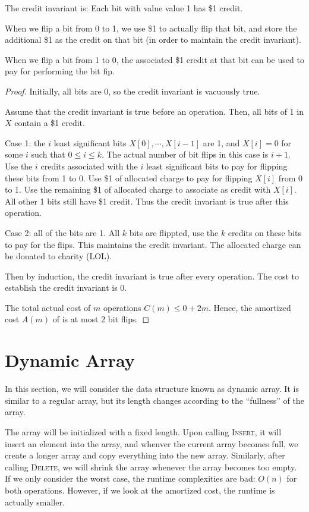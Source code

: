The credit invariant is: Each bit with value value 1 has \$1 credit.

When we flip a bit from 0 to 1, we use \$1 to actually flip that bit, and store the additional \$1 as the credit on that bit (in order to maintain the credit invariant).

When we flip a bit from 1 to 0, the associated \$1 credit at that bit can be used to pay for performing the bit fip.

\begin{proof}
    Initially, all bits are 0, so the credit invariant is vacuously true.

    Assume that the credit invariant is true before an  operation. Then, all bits of 1 in $X$ contain a \$1 credit.

    Case 1: the $i$ least significant bits $X[0],\cdots,X[i-1]$ are 1, and $X[i] = 0$ for some $i$ such that $0 \leq i \leq k$. The actual number of bit flips in this case is $i+1$. Use the $i$ credits associated with the $i$ least significant bits to pay for flipping these bits from 1 to 0. Use \$1 of allocated charge to pay for flipping $X[i]$ from 0 to 1. Use the remaining \$1 of allocated charge to associate as credit with $X[i]$. All other 1 bits still have \$1 credit. Thus the credit invariant is true after this  operation.

    Case 2: all of the bits are 1. All $k$ bits are flippted, use the $k$ credits on these bits to pay for the flips. This maintains the credit invariant. The allocated charge can be donated to charity (LOL).

    Then by induction, the credit invariant is true after every  operation. The cost to establish the credit invariant is 0.

    The total actual cost of $m$ operations $C(m) \leq 0 + 2m$. Hence, the amortized cost $A(m)$ of  is at most 2 bit flips.  
\end{proof}

\section{Dynamic Array}

In this section, we will consider the data structure known as dynamic array. It is similar to a regular array, but its length changes according to the ``fullness'' of the array.


The array will be initialized with a fixed length. Upon calling \textsc{Insert}, it will insert an element into the array, and whenver the current array becomes full, we create a longer array and copy everything into the new array. Similarly, after calling \textsc{Delete}, we will shrink the array whenever the array becomes too empty. If we only consider the worst case, the runtime complexities are bad: $O(n)$ for both operations. However, if we look at the amortized cost, the runtime is actually smaller.

